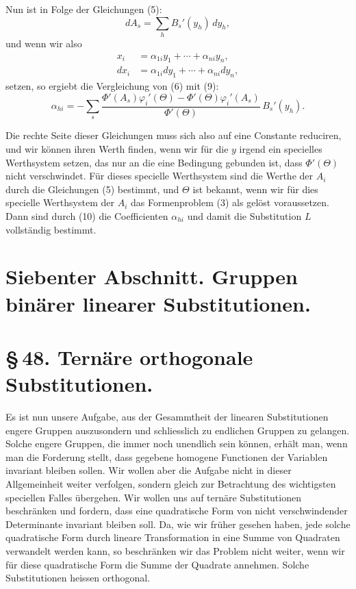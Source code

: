 \documentclass[11pt]{article}
\begin{document}
Nun ist in Folge der Gleichungen (5):
\begin{equation}
dA_s=\sum_h B_s'(y_h)\,dy_h,
\tag{7}
\end{equation}
und wenn wir also
\begin{align}
x_i&=\alpha_{1i}y_1+\cdots+\alpha_{ni}y_n,\tag{8}\\
dx_i&=\alpha_{1i}dy_1+\cdots+\alpha_{ni}dy_n,\tag{9}
\end{align}
setzen, so ergiebt die Vergleichung von (6) mit (9):
\begin{equation}
\alpha_{hi}=-\sum_s\frac{\Phi'(A_s)\varphi_i'(\Theta)-\Phi'(\Theta)\varphi_i'(A_s)}{\Phi'(\Theta)}\,B_s'(y_h).
\tag{10}
\end{equation}

Die rechte Seite dieser Gleichungen muss sich also auf eine Constante reduciren, und wir können ihren Werth finden, wenn wir für die $y$ irgend ein specielles Werthsystem setzen, das nur an die eine Bedingung gebunden ist, dass $\Phi'(\Theta)$ nicht verschwindet. Für dieses specielle Werthsystem sind die Werthe der $A_i$ durch die Gleichungen (5) bestimmt, und $\Theta$ ist bekannt, wenn wir für dies specielle Werthsystem der $A_i$ das Formenproblem (3) als gelöst voraussetzen. Dann sind durch (10) die Coefficienten $\alpha_{hi}$ und damit die Substitution $L$ vollständig bestimmt.

\section*{Siebenter Abschnitt. Gruppen binärer linearer Substitutionen.}
\section*{\S\,48. Ternäre orthogonale Substitutionen.}

Es ist nun unsere Aufgabe, aus der Gesammtheit der linearen Substitutionen engere Gruppen auszusondern und schliesslich zu endlichen Gruppen zu gelangen. Solche engere Gruppen, die immer noch unendlich sein können, erhält man, wenn man die Forderung stellt, dass gegebene homogene Functionen der Variablen invariant bleiben sollen. Wir wollen aber die Aufgabe nicht in dieser Allgemeinheit weiter verfolgen, sondern gleich zur Betrachtung des wichtigsten speciellen Falles übergehen. Wir wollen uns auf ternäre Substitutionen beschränken und fordern, dass eine quadratische Form von nicht verschwindender Determinante invariant bleiben soll. Da, wie wir früher gesehen haben, jede solche quadratische Form durch lineare Transformation in eine Summe von Quadraten verwandelt werden kann, so beschränken wir das Problem nicht weiter, wenn wir für diese quadratische Form die Summe der Quadrate annehmen. Solche Substitutionen heissen orthogonal.
\end{document}
